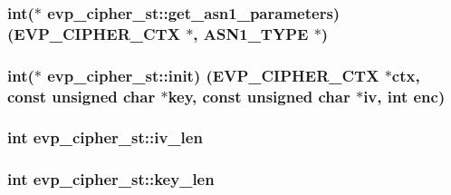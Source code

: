 \subsubsection[{\texorpdfstring{get\+\_\+asn1\+\_\+parameters}{get_asn1_parameters}}]{\setlength{\rightskip}{0pt plus 5cm}int($\ast$ evp\+\_\+cipher\+\_\+st\+::get\+\_\+asn1\+\_\+parameters) ({\bf E\+V\+P\+\_\+\+C\+I\+P\+H\+E\+R\+\_\+\+C\+TX} $\ast$, {\bf A\+S\+N1\+\_\+\+T\+Y\+PE} $\ast$)}\hypertarget{structevp__cipher__st_a438856068bda2e643c3e1a713d77ad66}{}\label{structevp__cipher__st_a438856068bda2e643c3e1a713d77ad66}
\subsubsection[{\texorpdfstring{init}{init}}]{\setlength{\rightskip}{0pt plus 5cm}int($\ast$ evp\+\_\+cipher\+\_\+st\+::init) ({\bf E\+V\+P\+\_\+\+C\+I\+P\+H\+E\+R\+\_\+\+C\+TX} $\ast$ctx, const unsigned char $\ast$key, const unsigned char $\ast$iv, int enc)}\hypertarget{structevp__cipher__st_a1459fa00f4ae13d2f6ede957ec33165c}{}\label{structevp__cipher__st_a1459fa00f4ae13d2f6ede957ec33165c}
\subsubsection[{\texorpdfstring{iv\+\_\+len}{iv_len}}]{\setlength{\rightskip}{0pt plus 5cm}int evp\+\_\+cipher\+\_\+st\+::iv\+\_\+len}\hypertarget{structevp__cipher__st_add3e3ebb7252cd8326a98d309877a134}{}\label{structevp__cipher__st_add3e3ebb7252cd8326a98d309877a134}
\subsubsection[{\texorpdfstring{key\+\_\+len}{key_len}}]{\setlength{\rightskip}{0pt plus 5cm}int evp\+\_\+cipher\+\_\+st\+::key\+\_\+len}\hypertarget{structevp__cipher__st_a6f3df99c0808facaf1a5bb730cbd0b22}{}\label{structevp__cipher__st_a6f3df99c0808facaf1a5bb730cbd0b22}
